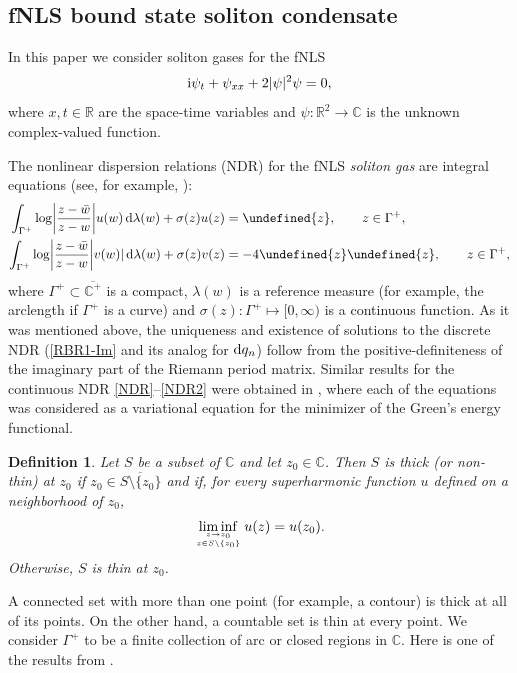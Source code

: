 \documentclass[pdftex]{sigma}
\numberwithin{equation}{section}
\newtheorem{Definition}[Theorem]{Definition}
\let\Re\undefined
\let\Im\undefined
\DeclareMathOperator{\Re}{Re}
\DeclareMathOperator{\Im}{Im}
\def\ra{\rightarrow}
\newcommand{\G}{\Gamma}
\def\C{{\mathbb C}}
\def\R{{\mathbb R}}
\def\l{\lambda}
\def\l{\lambda}
\def\G{\Gamma}
\begin{document}
\subsection{fNLS bound state soliton condensate}\label{sec-KdV}

In this paper we consider soliton gases for the fNLS
\begin{equation*} %
{\rm i} \psi_t + \psi_{xx} +2 |\psi|^2 \psi=0,
\end{equation*}
where $x,t\in \R$ are the space-time variables and $\psi\colon \R^2 \ra \C$ is the unknown complex-valued function.

The nonlinear dispersion relations (NDR) for the fNLS \textit{soliton gas} are
integral equations (see, for example, \cite{ET2020,TW}):
\begin{align}\label{NDR}
\int_{\G^+}\log\biggl|\frac{z-\bar w}{z-w}\biggr|u(w)\,{\rm d}\l(w)+\sigma(z)u(z)&=\Im{z},\qquad z\in \G^+,\\
\int_{\G^+}\log\biggl|\frac{z-\bar w}{z-w}\biggr|v(w)|\,{\rm d}\l(w)+\sigma(z)v(z)&=-4\Re{z}\Im{z},\qquad z\in \G^+,
\label{NDR2}
\end{align}
where $\G^+\subset \overline{\C^+}$ is a compact, $\l(w)$ is a reference measure (for example, the arclength if $\G^+$ is a curve) and $\sigma(z)\colon \G^+\mapsto [0,\infty)$ is a continuous function.
As it was mentioned above, the uniqueness and existence of solutions to the discrete NDR (\eqref{RBR1-Im} and its analog for ${\rm d}q_n$) follow from the positive-definiteness of the imaginary part of the Riemann period matrix.
Similar results for the continuous NDR \eqref{NDR}--\eqref{NDR2} were obtained in \cite{KT2021},
where each of the equations
was considered as a variational equation for the minimizer of the Green's energy functional.

\begin{Definition} \label{thick}
Let $S$ be a subset of $\mathbb C$ and let $z_0 \in
\mathbb C$. Then $S$ is thick (or non-thin) at
$z_0$ if $z_0 \in \overline{S \setminus \{z_0\}}$
and if, for every superharmonic function
$u$ defined on a neighborhood of $z_0$,
\[ \liminf_{z \ra z_0 \atop z \in S \setminus \{ z_0\}} u(z) = u(z_0). \]
Otherwise, $S$ is thin at $z_0$.
\end{Definition}

A connected set with more than one point (for example, a contour) is thick at
all of its points. On the other hand, a countable set
is thin at every point. We consider $\G^+$ to be a finite collection of arc or closed regions in $\C$. Here is one of the results from \cite{KT2021}.
\end{document}
